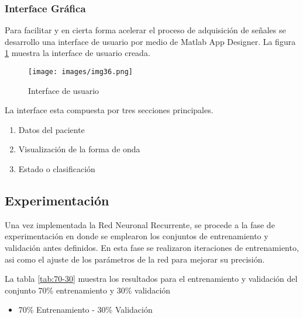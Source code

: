 \subsubsection{Interface Gráfica}
Para facilitar y en cierta forma acelerar el proceso de adquisición de señales se desarrollo una interface de usuario por medio de Matlab App Designer. La figura \ref{fig:Interface} muestra la interface de usuario creada. 

\begin{figure}[!ht]
    \centering
    \texttt{[image: images/img36.png]}
    \caption{Interface de usuario}
    \label{fig:Interface}
\end{figure}

La interface esta compuesta por tres secciones principales.

\begin{enumerate}
    \item Datos del paciente
    \item Visualización de la forma de onda
    \item Estado o clasificación
\end{enumerate}


\subsection[]{Experimentación}
Una vez implementada la Red Neuronal Recurrente, se procede a la fase de experimentación en donde se emplearon los conjuntos de entrenamiento y validación antes definidos. En esta fase se realizaron iteraciones de entrenamiento, asi como el ajuste de los parámetros de la red para mejorar su precisión.

La tabla \ref{tab:70-30} muestra los resultados para el entrenamiento y validación del conjunto 70\% entrenamiento y 30\% validación

\begin{itemize}
    \item 70\% Entrenamiento - 30\% Validación
\end{itemize}

